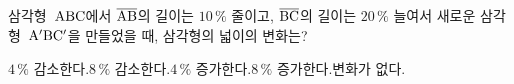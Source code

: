 \noindent\begin{minipage}[t]{0.58\linewidth}\vspace{0pt}\raggedright 삼각형~$\mathrm{ABC}$에서 $\overline{\mathrm{AB}}$의 길이는 $10\,\%$ 줄이고, $\overline{\mathrm{BC}}$의 길이는 $20\,\%$ 늘여서 새로운 삼각형~$\mathrm{A'BC'}$을 만들었을 때, 삼각형의 넓이의 변화는?\end{minipage}\hfill\begin{minipage}[t]{0.4\linewidth}\vspace{0pt}\centering \resizebox{\ifdim\width>\linewidth\linewidth\else\width\fi}{!}{}\end{minipage}\par
\begin{choicesii}{$4\,\%$ 감소한다.}{$8\,\%$ 감소한다.}{$4\,\%$ 증가한다.}{$8\,\%$ 증가한다.}{변화가 없다.}\end{choicesii}
